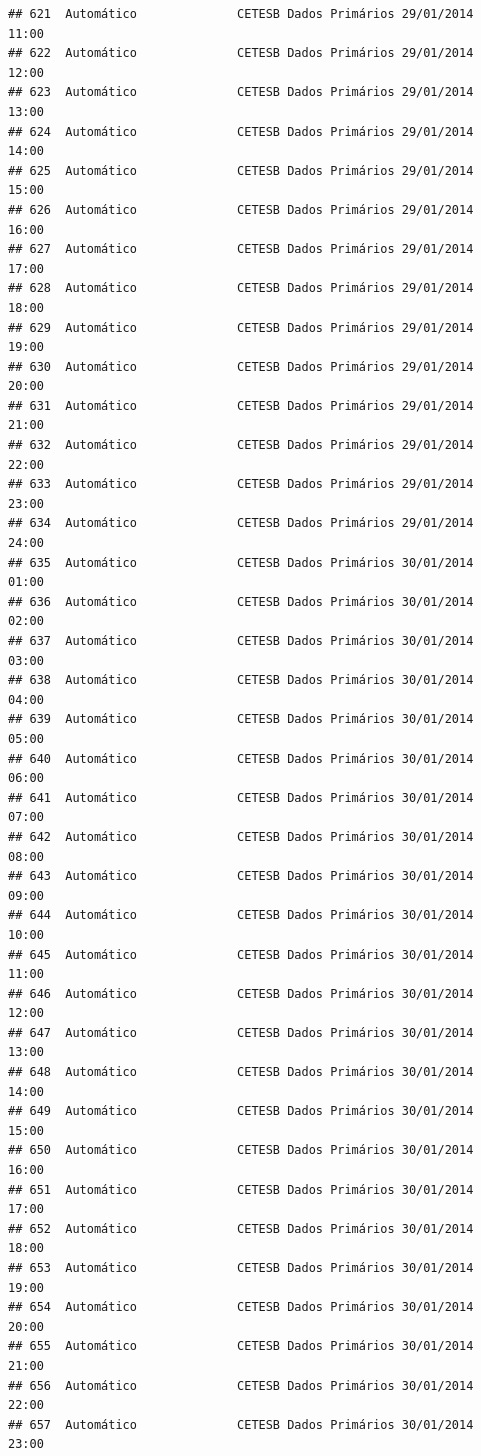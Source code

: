 \documentclass[]{book}
\begin{document}
\begin{verbatim}
## 621  Automático              CETESB Dados Primários 29/01/2014 11:00
## 622  Automático              CETESB Dados Primários 29/01/2014 12:00
## 623  Automático              CETESB Dados Primários 29/01/2014 13:00
## 624  Automático              CETESB Dados Primários 29/01/2014 14:00
## 625  Automático              CETESB Dados Primários 29/01/2014 15:00
## 626  Automático              CETESB Dados Primários 29/01/2014 16:00
## 627  Automático              CETESB Dados Primários 29/01/2014 17:00
## 628  Automático              CETESB Dados Primários 29/01/2014 18:00
## 629  Automático              CETESB Dados Primários 29/01/2014 19:00
## 630  Automático              CETESB Dados Primários 29/01/2014 20:00
## 631  Automático              CETESB Dados Primários 29/01/2014 21:00
## 632  Automático              CETESB Dados Primários 29/01/2014 22:00
## 633  Automático              CETESB Dados Primários 29/01/2014 23:00
## 634  Automático              CETESB Dados Primários 29/01/2014 24:00
## 635  Automático              CETESB Dados Primários 30/01/2014 01:00
## 636  Automático              CETESB Dados Primários 30/01/2014 02:00
## 637  Automático              CETESB Dados Primários 30/01/2014 03:00
## 638  Automático              CETESB Dados Primários 30/01/2014 04:00
## 639  Automático              CETESB Dados Primários 30/01/2014 05:00
## 640  Automático              CETESB Dados Primários 30/01/2014 06:00
## 641  Automático              CETESB Dados Primários 30/01/2014 07:00
## 642  Automático              CETESB Dados Primários 30/01/2014 08:00
## 643  Automático              CETESB Dados Primários 30/01/2014 09:00
## 644  Automático              CETESB Dados Primários 30/01/2014 10:00
## 645  Automático              CETESB Dados Primários 30/01/2014 11:00
## 646  Automático              CETESB Dados Primários 30/01/2014 12:00
## 647  Automático              CETESB Dados Primários 30/01/2014 13:00
## 648  Automático              CETESB Dados Primários 30/01/2014 14:00
## 649  Automático              CETESB Dados Primários 30/01/2014 15:00
## 650  Automático              CETESB Dados Primários 30/01/2014 16:00
## 651  Automático              CETESB Dados Primários 30/01/2014 17:00
## 652  Automático              CETESB Dados Primários 30/01/2014 18:00
## 653  Automático              CETESB Dados Primários 30/01/2014 19:00
## 654  Automático              CETESB Dados Primários 30/01/2014 20:00
## 655  Automático              CETESB Dados Primários 30/01/2014 21:00
## 656  Automático              CETESB Dados Primários 30/01/2014 22:00
## 657  Automático              CETESB Dados Primários 30/01/2014 23:00

\end{verbatim}
\end{document}
